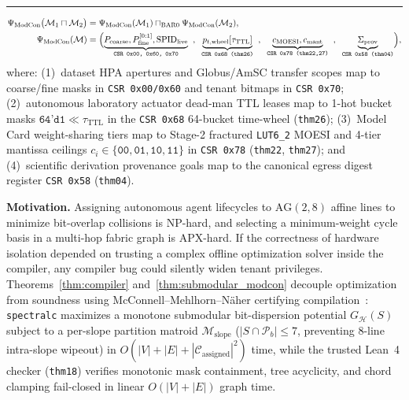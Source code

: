 \documentclass[10pt,twocolumn]{article}
\makeatletter
\newif\ifspecintwocol \specintwocolfalse
\newif\ifspecresume   \specresumefalse
\newcommand{\StopTwoCol}{%
  \if@twocolumn
    \onecolumn
    \global\specintwocolfalse
    \let\spec@next\@empty
  \else
    \ifspecintwocol
      \global\specintwocolfalse
      \def\spec@next{\end{multicols}}%
    \else
      \let\spec@next\@empty
    \fi
  \fi
  \spec@next
}
\newcommand{\BeginConnesPlate}{%
  \if@twocolumn
    \onecolumn
    \global\specresumetrue
    \let\spec@platepre\@empty
  \else
    \ifspecintwocol
      \global\specresumetrue
      \let\spec@platepre\StopTwoCol
    \else
      \global\specresumefalse
      \let\spec@platepre\@empty
    \fi
  \fi
  \spec@platepre
  \par\vspace{4pt}\noindent\textcolor{black!25}{\rule{\textwidth}{0.4pt}}\par\vspace{3pt}%
}
\theoremstyle{spectralthm}
\makeatother
\begin{document}
\BeginConnesPlate
\begin{equation}
\label{eq:modcon_map}
\begin{aligned}
\Psi_{\mathrm{ModCon}}\bigl(\mathcal{M}_1 \sqcap \mathcal{M}_2\bigr) &= \Psi_{\mathrm{ModCon}}(\mathcal{M}_1) \sqcap_{\mathrm{BAR0}} \Psi_{\mathrm{ModCon}}(\mathcal{M}_2),\\
\Psi_{\mathrm{ModCon}}(\mathcal{M}) &= \Bigl(\underbrace{P_{\mathrm{coarse}}, P_{\mathrm{fine}}^{[0:1]}, \mathrm{SPID}_{\mathrm{live}}}_{\texttt{\scriptsize CSR 0x00, 0x60, 0x70}}\;\;,\;\;
\underbrace{p_{t,\mathrm{wheel}}[\tau_{\mathrm{TTL}}]}_{\texttt{\scriptsize CSR 0x68 (thm26)}}\;\;,\;\;
\underbrace{c_{\mathrm{MOESI}}, c_{\mathrm{mant}}}_{\texttt{\scriptsize CSR 0x78 (thm22,27)}}\;\;,\;\;
\underbrace{\Sigma_{\mathrm{prov}}}_{\texttt{\scriptsize CSR 0x58 (thm04)}}\Bigr),
\end{aligned}
\end{equation}
\noindent where: (1)~dataset HPA apertures and Globus/AmSC transfer scopes map to coarse/fine masks in \texttt{CSR 0x00/0x60} and tenant bitmaps in \texttt{CSR 0x70}; (2)~autonomous laboratory actuator dead-man TTL leases map to 1-hot bucket masks $\texttt{64'd1} \ll \tau_{\mathrm{TTL}}$ in the \texttt{CSR 0x68} 64-bucket time-wheel (\texttt{thm26}); (3)~Model Card weight-sharing tiers map to Stage-2 fractured \mbox{\texttt{LUT6\_2}} MOESI and 4-tier mantissa ceilings $c_i \in \{\texttt{00},\texttt{01},\texttt{10},\texttt{11}\}$ in \texttt{CSR 0x78} (\texttt{thm22}, \texttt{thm27}); and (4)~scientific derivation provenance goals map to the canonical egress digest register \texttt{CSR 0x58} (\texttt{thm04}).

\medskip
\noindent\textbf{Motivation.}\; Assigning autonomous agent lifecycles to $\mathrm{AG}(2,8)$ affine lines to minimize bit-overlap collisions is NP-hard, and selecting a minimum-weight cycle basis in a multi-hop fabric graph is APX-hard. If the correctness of hardware isolation depended on trusting a complex offline optimization solver inside the compiler, any compiler bug could silently widen tenant privileges. Theorems~\ref{thm:compiler} and~\ref{thm:submodular_modcon} decouple optimization from soundness using McConnell--Mehlhorn--N\"{a}her certifying compilation~\cite{mcconnell2011certifying}: \texttt{spectralc} maximizes a monotone submodular bit-dispersion potential $G_{\mathcal{H}}(S)$ subject to a per-slope partition matroid $\mathcal{M}_{\mathrm{slope}}$ ($|S \cap \mathcal{P}_b| \le 7$, preventing 8-line intra-slope wipeout) in $O(|V| + |E| + |\mathcal{C}_{\mathrm{assigned}}|^2)$ time, while the trusted Lean~4 checker (\texttt{thm18}) verifies monotonic mask containment, tree acyclicity, and chord clamping fail-closed in linear $O(|V| + |E|)$ graph time.
\end{document}
